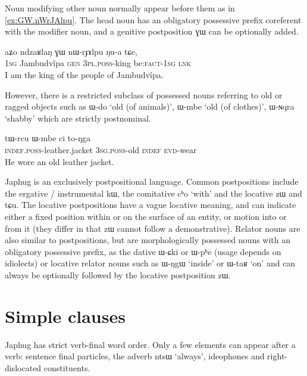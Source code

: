 \documentclass[oldfontcommands,oneside,a4paper,11pt]{article}
\newcommand{\ipa}[1]{{\phon#1}} %
\begin{document}
Noun modifying other noun normally appear before them as in \ref{ex:GW.nWrJAlpu}. The head noun has an obligatory possessive prefix coreferent with the modifier noun, and a genitive postposition \ipa{ɣɯ} can be optionally added.

\begin{exe}
\ex \label{ex:GW.nWrJAlpu}
\gll
\ipa{aʑo}  	\ipa{ndzaʁlaŋ}  	\ipa{ɣɯ}  	\ipa{nɯ-rɟɤlpu}  	\ipa{ŋu-a}  	\ipa{tɕe,}  
 \\
\textsc{1sg} Jambudvîpa \textsc{gen} \textsc{3pl.poss}-king  be:\textsc{fact}-\textsc{1sg} \textsc{lnk} \\
\glt I am the king of the people of Jambudvîpa.
\end{exe}

However, there is a  restricted subclass of possessed nouns referring to old or ragged objects such as \ipa{ɯ-do} `old (of animals)', \ipa{ɯ-mbe} `old (of clothes)', \ipa{ɯ-ɴqra} `shabby' which are strictly postnominal.


\begin{exe}
\ex \label{ex:Wmbe}
\gll
\ipa{tɯ-rcu} 	\ipa{ɯ-mbe} 	\ipa{ci} 	\ipa{to-ŋga} \\
\textsc{indef.poss}-leather.jacket \textsc{3sg.poss}-old \textsc{indef} \textsc{evd}-wear \\
\glt He wore an old leather jacket.
\end{exe}

Japhug is an exclusively postpositional language. Common postpositions include the ergative / instrumental \ipa{kɯ}, the comitative \ipa{cʰo} `with' and the locative \ipa{zɯ} and \ipa{tɕu}. The locative postpositions have a vague locative meaning, and can indicate either a fixed position within or on the surface of an entity, or motion into or from it (they differ in that \ipa{zɯ} cannot follow a demonstrative). Relator nouns are also similar to postpositions, but are morphologically possessed nouns with an obligatory possessive prefix, as the dative \ipa{ɯ-ɕki} or \ipa{ɯ-pʰe} (usage depends on  idiolects) or locative relator nouns such as \ipa{ɯ-ŋgɯ} `inside' or \ipa{ɯ-taʁ} `on' and can always be optionally followed by the locative postposition \ipa{zɯ}.

\section{Simple clauses} 

Japhug has strict verb-final word order. Only a few elements can appear after a verb: sentence final particles, the adverb \ipa{ntsɯ} `always', ideophones and right-dislocated constituents.
\end{document}
